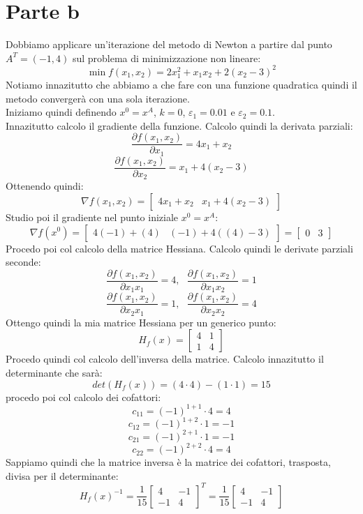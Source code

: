 \documentclass[a4paper,12pt, oneside]{book}
\begin{document}
\section{Parte b}
Dobbiamo applicare un'iterazione del metodo di Newton a partire dal
punto $A^T=(-1,4)$ sul problema di minimizzazione non lineare:
\[\min f(x_1,x_2)=2x_1^2+x_1x_2+2(x_2-3)^2\]
Notiamo innazitutto che abbiamo a che fare con una funzione quadratica
quindi il metodo convergerà con una sola iterazione.\\
Iniziamo quindi definendo $x^0=x^A$, $k=0$, $\varepsilon_1=0.01$ e
$\varepsilon_2=0.1$.\\
Innazitutto calcolo il gradiente della funzione. Calcolo quindi la
derivata parziali:
\[\frac{\partial f(x_1,x_2)}{\partial x_1}=4x_1+x_2\]
\[\frac{\partial f(x_1,x_2)}{\partial x_2}=x_1+4(x_2-3)\]
Ottenendo quindi:
\[\nabla f(x_1,x_2)=[
  \begin{matrix}
    4x_1+x_2 & x_1+4(x_2-3)
  \end{matrix}]
\]
Studio poi il gradiente nel punto iniziale $x^0=x^A$:
\[\nabla f(x^0)=[
  \begin{matrix}
    4(-1)+(4) & (-1)+4((4)-3)
  \end{matrix}]=[
  \begin{matrix}
    0 & 3
  \end{matrix}]
\]
Procedo poi col calcolo della matrice Hessiana. Calcolo quindi le
derivate parziali seconde:
\[\frac{\partial f(x_1,x_2)}{\partial x_1x_1}=4,\,\,\,\,\frac{\partial
    f(x_1,x_2)}{\partial x_1x_2}=1\] 
\[\frac{\partial f(x_1,x_2)}{\partial x_2x_1}=1,\,\,\,\,\frac{\partial
    f(x_1,x_2)}{\partial x_2x_2}=4\] 
Ottengo quindi la mia matrice Hessiana per un generico punto:
\[H_f(x)=\left[
    \begin{matrix}
      4 & 1\\
      1 & 4
    \end{matrix}
  \right]
\]
\newpage
Procedo quindi col calcolo dell'inversa della matrice. Calcolo
innazitutto il determinante che sarà:
\[det(H_f(x))=(4\cdot 4)-(1\cdot 1)=15\]
procedo poi col calcolo dei cofattori:
\[c_{11}=(-1)^{1+1}\cdot 4 =4\]
\[c_{12}=(-1)^{1+2}\cdot 1 =-1\]
\[c_{21}=(-1)^{2+1}\cdot 1 =-1\]
\[c_{22}=(-1)^{2+2}\cdot 4 =4\]
Sappiamo quindi che la matrice inversa è la matrice dei cofattori,
trasposta, divisa per il determinante:
\[H_f(x)^{-1}=\frac{1}{15}\left[
    \begin{matrix}
      4 & -1\\
      -1 & 4
    \end{matrix}
  \right]^T=\frac{1}{15}\left[
    \begin{matrix}
      4 & -1\\
      -1 & 4
    \end{matrix}
  \right]
\]
\end{document}

